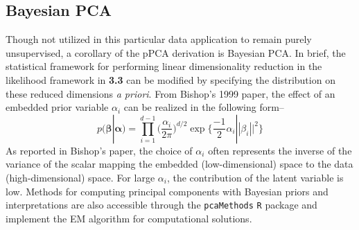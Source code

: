 \documentclass[english, 11pt]{article}\usepackage[]{graphicx}\usepackage[]{color}
\begin{document}
\subsection{Bayesian PCA}
Though not utilized in this particular data application to remain purely unsupervised, a corollary of the pPCA derivation is Bayesian PCA. In brief, the statistical framework for performing linear dimensionality reduction in the likelihood framework in \textbf{3.3} can be modified by specifying the distribution on these reduced dimensions \textit{a priori}. \cite{bishop1999bayesian} From Bishop's 1999 paper, \cite{bishop1999bayesian} the effect of an embedded prior variable $\alpha_i$ can be realized in the following form--
$$p(\mathbf{\beta} |  \mathbf{\alpha}) = \prod_{i=1}^{d-1}\Big( \frac{\alpha_i}{2 \pi} \Big)^{d/2} \exp \Big \{ \frac{-1}{2}\alpha_i||\beta_i||^2\Big \}$$
As reported in Bishop's paper, the choice of $\alpha_i$ often represents the inverse of the variance of the scalar mapping the embedded (low-dimensional) space to the data (high-dimensional) space. For large $\alpha_i$, the contribution of the latent variable is low. Methods for computing principal components with Bayesian priors and interpretations are also accessible through the \texttt{pcaMethods} \texttt{R} package and implement the EM algorithm \cite{dempster1977maximum} for computational solutions. 




\end{document}
